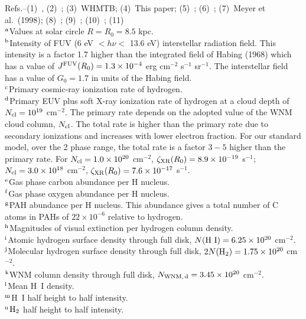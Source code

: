\documentclass[12pt,preprint,flushrt]{aastex}
\begin{document}
{\noindent
Refs.--{(1)~\cite{dra78}, (2)~\cite{hab68}; (3)~WHMTB;
(4)~This paper; (5)~\cite{car96}; (6)~\cite{sof97}; 
(7)~Meyer et al.\ (1998); (8)~\cite{tie99};
(9)~\cite{boh78}; (10)~\cite{dic90}; (11)~\cite{bron00}}\\
\noindent
$^{\rm {a}}${Values at solar circle  $R=R_0=8.5$ kpc.}\\
$^{\rm {b}}${Intensity of FUV (6 eV $< h\nu  <$ 13.6 eV)
   interstellar radiation field. This intensity is a factor 1.7 higher
    than the integrated field
    of Habing (1968) which has a value of
    $J^{\rm FUV}(R_0) = 1.3\times 10^{-4}$ erg cm$^{-2}$ s$^{-1}$
    sr$^{-1}$. The interstellar field has a value of
    $G_0 = 1.7$  in  units of the Habing field.}\\
$^{\rm {c}}${Primary cosmic-ray ionization rate of hydrogen.}\\
$^{\rm {d}}${Primary EUV plus soft X-ray ionization rate of hydrogen at
a cloud depth of $N_{\rm cl} = 10^{19}$ cm$^{-2}$.
The primary rate  depends on the adopted value of the WNM
cloud column, $N_{\rm cl}$. The total rate is higher than 
the primary rate due to secondary ionizations and increases with lower
electron fraction. For our standard model, over the 2 phase range,
the total rate is a factor $3-5$ higher than the primary rate.
For
$N_{\rm cl} = 1.0\times 10^{20}$ cm$^{-2}$,
$\zeta_{\rm XR}(R_0) = 8.9\times 10^{-19}$ s$^{-1}$;
$N_{\rm cl} = 3.0\times 10^{18}$ cm$^{-2}$,
$\zeta_{\rm XR}(R_0) = 7.6\times 10^{-17}$ s$^{-1}$.}\\
$^{\rm {e}}${Gas phase carbon abundance per H nucleus.}\\
$^{\rm {f}}${Gas phase oxygen abundance per H nucleus.}\\
$^{\rm {g}}${PAH abundance per H nucleus. This abundance gives a total
number of C atoms in PAHs of $22\times 10^{-6}$ relative to hydrogen.}\\
$^{\rm {h}}${Magnitudes of visual extinction per hydrogen column density.}\\
$^{\rm {i}}${Atomic hydrogen surface density through full disk,
           $N({\rm H~I})= 6.25\times 10^{20}$ cm$^{-2}$.}\\
$^{\rm {j}}${Molecular hydrogen surface density through full disk,
           $2N({\rm H_2})=1.75\times 10^{20}$ cm$^{-2}$.}\\
$^{\rm {k}}${WNM column density through full disk,
           $N_{\rm WNM,\, d}=3.45\times 10^{20}$ cm$^{-2}$.}\\
$^{\rm {l}}${Mean H~I density.}\\
$^{\rm {m}}${H~I half height to half intensity.}\\
$^{\rm {n}}${${\rm H_2}$ half height to half intensity.}\\
}
\end{document}
